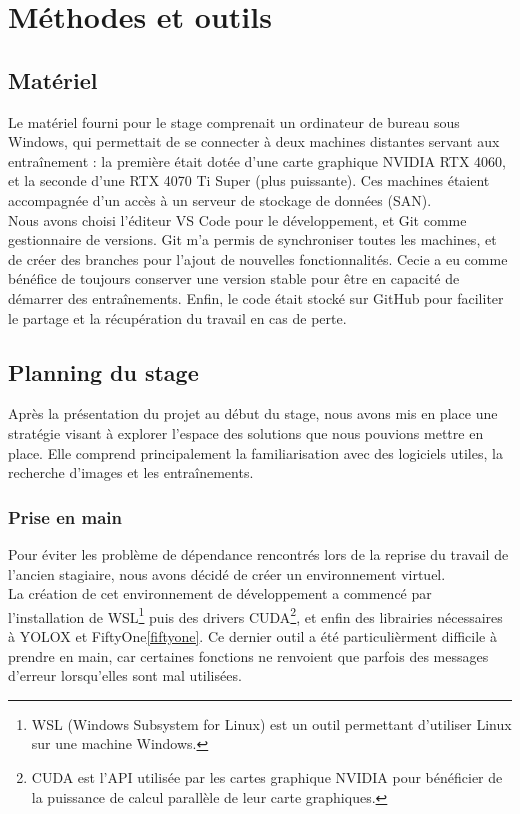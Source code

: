 \chapter{Méthodes et outils}

\section{Matériel}

Le matériel fourni pour le stage comprenait un ordinateur de bureau sous Windows,
qui permettait de se connecter à deux machines distantes servant aux entraînement :
la première était dotée d'une carte graphique NVIDIA RTX 4060, et la seconde d'une
RTX 4070 Ti Super (plus puissante). Ces machines étaient accompagnée d'un accès à un serveur
de stockage de données (SAN). \\

Nous avons choisi l'éditeur VS Code pour le développement, et Git comme gestionnaire de versions.
Git m'a permis de synchroniser toutes les machines, et de créer des branches pour
l'ajout de nouvelles fonctionnalités. Cecie a eu comme bénéfice de toujours
conserver une version stable pour être en capacité de démarrer des entraînements.
Enfin, le code était stocké sur GitHub pour faciliter le partage
et la récupération du travail en cas de perte. \\

\section{Planning du stage}

Après la présentation du projet au début du stage, nous avons mis en place une stratégie
visant à explorer l'espace des solutions que nous pouvions mettre en place. 
Elle comprend principalement la familiarisation avec des logiciels utiles, 
la recherche d'images et les entraînements. 

\subsection{Prise en main}

Pour éviter les problème de dépendance rencontrés lors de la reprise du 
travail de l'ancien stagiaire, nous avons décidé de créer un environnement virtuel. \\

La création de cet environnement de développement a commencé par l'installation
de WSL\footnote{WSL (Windows Subsystem for Linux) est un outil permettant d'utiliser
Linux sur une machine Windows.} puis des drivers CUDA\footnote{CUDA est l'API utilisée par
les cartes graphique NVIDIA pour bénéficier de la puissance de calcul parallèle
de leur carte graphiques.}, et enfin des librairies nécessaires à YOLOX et FiftyOne\ref{fiftyone}.
Ce dernier outil a été particulièrment difficile à prendre en main,
car certaines fonctions ne renvoient que parfois des messages d'erreur
lorsqu'elles sont mal utilisées.\\

